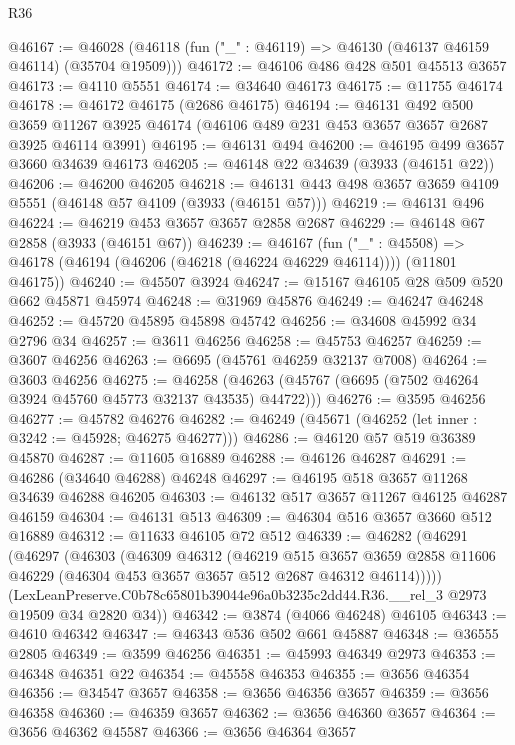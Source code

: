 \begin{lexlean}{R36}
\begin{coremodule}
@46167 := @46028 (@46118 (fun ("_" : @46119) => @46130 (@46137 @46159 @46114) (@35704 @19509)))
@46172 := @46106 @486 @428 @501 @45513 @3657
@46173 := @4110 @5551
@46174 := @34640 @46173
@46175 := @11755 @46174
@46178 := @46172 @46175 (@2686 @46175)
@46194 := @46131
    @492
    @500
    @3659
    @11267
    @3925
    @46174
    (@46106 @489 @231 @453 @3657 @3657 @2687 @3925 @46114 @3991)
@46195 := @46131 @494
@46200 := @46195 @499 @3657 @3660 @34639 @46173
@46205 := @46148 @22 @34639 (@3933 (@46151 @22))
@46206 := @46200 @46205
@46218 := @46131 @443 @498 @3657 @3659 @4109 @5551 (@46148 @57 @4109 (@3933 (@46151 @57)))
@46219 := @46131 @496
@46224 := @46219 @453 @3657 @3657 @2858 @2687
@46229 := @46148 @67 @2858 (@3933 (@46151 @67))
@46239 := @46167
    (fun ("_" : @45508) => @46178 (@46194 (@46206 (@46218 (@46224 @46229 @46114)))) (@11801 @46175))
@46240 := @45507 @3924
@46247 := @15167 @46105 @28 @509 @520 @662 @45871 @45974
@46248 := @31969 @45876
@46249 := @46247 @46248
@46252 := @45720 @45895 @45898 @45742
@46256 := @34608 @45992 @34 @2796 @34
@46257 := @3611 @46256
@46258 := @45753 @46257
@46259 := @3607 @46256
@46263 := @6695 (@45761 @46259 @32137 @7008)
@46264 := @3603 @46256
@46275 := @46258 (@46263 (@45767 (@6695 (@7502 @46264 @3924 @45760 @45773 @32137 @43535) @44722)))
@46276 := @3595 @46256
@46277 := @45782 @46276
@46282 := @46249 (@45671 (@46252 (let inner : @3242 := @45928; @46275 @46277)))
@46286 := @46120 @57 @519 @36389 @45870
@46287 := @11605 @16889
@46288 := @46126 @46287
@46291 := @46286 (@34640 @46288) @46248
@46297 := @46195 @518 @3657 @11268 @34639 @46288 @46205
@46303 := @46132 @517 @3657 @11267 @46125 @46287 @46159
@46304 := @46131 @513
@46309 := @46304 @516 @3657 @3660 @512 @16889
@46312 := @11633 @46105 @72 @512
@46339 := @46282
    (@46291
      (@46297
        (@46303
          (@46309
            @46312
            (@46219
              @515
              @3657
              @3659
              @2858
              @11606
              @46229
              (@46304 @453 @3657 @3657 @512 @2687 @46312 @46114)))))
      (LexLeanPreserve.C0b78c65801b39044e96a0b3235c2dd44.R36.__rel_3 @2973 @19509 @34 @2820 @34))
@46342 := @3874 (@4066 @46248) @46105
@46343 := @4610 @46342
@46347 := @46343 @536 @502 @661 @45887
@46348 := @36555 @2805
@46349 := @3599 @46256
@46351 := @45993 @46349 @2973
@46353 := @46348 @46351 @22
@46354 := @45558 @46353
@46355 := @3656 @46354
@46356 := @34547 @3657
@46358 := @3656 @46356 @3657
@46359 := @3656 @46358
@46360 := @46359 @3657
@46362 := @3656 @46360 @3657
@46364 := @3656 @46362 @45587
@46366 := @3656 @46364 @3657

\end{coremodule}
\end{lexlean}
